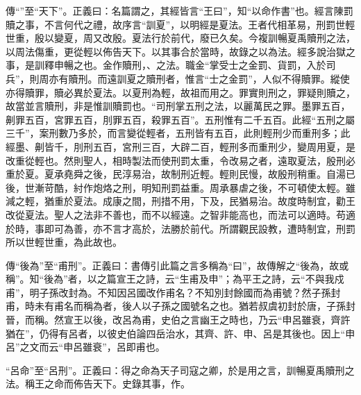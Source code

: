 {\noindent\zhuan{}\fzbyks 傳“”至“天下”。正義曰：名篇謂之，其經皆言“王曰”，知“以命作書”也。經言陳罰贖之事，不言何代之禮，故序言“訓夏”，以明經是夏法。王者代相革易，刑罰世輕世重，殷以變夏，周又改殷。夏法行於前代，廢已久矣。今複訓暢夏禹贖刑之法，以周法傷重，更從輕以佈告天下。以其事合於當時，故錄之以為法。經多說治獄之事，是訓釋申暢之也。金作贖刑，、之法。職金“掌受士之金罰、貨罰，入於司兵”，則周亦有贖刑。而遠訓夏之贖刑者，惟言“士之金罰”，人似不得贖罪。縱使亦得贖罪，贖必異於夏法。以夏刑為輕，故祖而用之。罪實則刑之，罪疑則贖之，故當並言贖刑，非是惟訓贖罰也。“司刑掌五刑之法，以麗萬民之罪。墨罪五百，劓罪五百，宮罪五百，刖罪五百，殺罪五百”。五刑惟有二千五百。此經“五刑之屬三千”，案刑數乃多於，而言變從輕者，五刑皆有五百，此則輕刑少而重刑多；此經墨、劓皆千，刖刑五百，宮刑三百，大辟二百，輕刑多而重刑少，變周用夏，是改重從輕也。然則聖人，相時製法而使刑罰太重，令改易之者，遠取夏法，殷刑必重於夏。夏承堯舜之後，民淳易治，故制刑近輕。輕則民慢，故殷刑稍重。自湯已後，世漸苛酷，紂作炮烙之刑，明知刑罰益重。周承暴虐之後，不可頓使太輕。雖減之輕，猶重於夏法。成康之間，刑措不用，下及，民猶易治。故度時制宜，勸王改從夏法。聖人之法非不善也，而不以經遠。之智非能高也，而法可以適時。苟適於時，事即可為善，亦不言才高於，法勝於前代。所謂觀民設教，遭時制宜，刑罰所以世輕世重，為此故也。 \par}

{\noindent\zhuan{}\fzbyks 傳“後為”至“甫刑”。正義曰：書傳引此篇之言多稱為“曰”，故傳解之“後為，故或稱”。知“後為”者，以之篇宣王之詩，云“生甫及申”；為平王之詩，云“不與我戍甫”，明子孫改封為。不知因呂國改作甫名？不知別封餘國而為甫號？然子孫封甫，時未有甫名而稱為者，後人以子孫之國號名之也。猶若叔虞初封於唐，子孫封晉，而稱。然宣王以後，改呂為甫，史伯之言幽王之時也，乃云“申呂雖衰，齊許猶在”，仍得有呂者，以彼史伯論四岳治水，其齊、許、申、呂是其後也。因上“申呂”之文而云“申呂雖衰”，呂即甫也。 \par}

{\noindent\shu{}\fzkt “呂命”至“呂刑”。正義曰：得之命為天子司寇之卿，於是用之言，訓暢夏禹贖刑之法。稱王之命而佈告天下。史錄其事，作。 \par}

